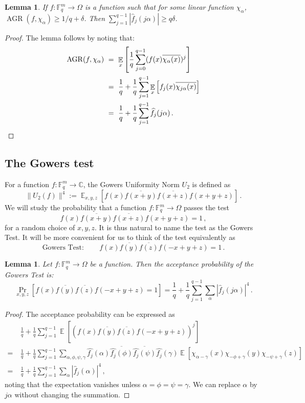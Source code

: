 \documentclass[10pt]{article}
\newtheorem{lemma}[theorem]{Lemma}
\theoremstyle{definition}
\numberwithin{equation}{section}
\newcommand\F{\mathbb{F}}
\DeclareMathOperator*\Exp{\mathbb{E}}
\DeclareMathOperator\AGR{AGR}
\renewcommand{\mapsto}{\to}
\begin{document}
\begin{lemma}\label{lemma:agr} If $f: \F_q^m \mapsto \Omega$ is a function such that for some
linear function $\chi_\alpha$, $\AGR(f, \chi_\alpha) \geq {1}/{q}+\delta$. Then
$\sum_{j=1}^{q-1} \left| \widehat{f}_{j}(j \alpha) \right| \geq q\delta$.
\end{lemma}
\begin{proof} The lemma follows by noting that:
\begin{align*}
\AGR(f, \chi_\alpha)\ &=\  \Exp_x \left[  \frac{1}{q} \sum_{j=0}^{q-1} (f(x) \overline{\chi_\alpha(x)})^j   \right] \\
 &=\   \frac{1}{q} + \frac{1}{q} \sum_{j=1}^{q-1} \Exp_x \left[ f_j(x) \overline{\chi_{j \alpha}(x)}   \right] \\
 &=\  \frac{1}{q} + \frac{1}{q}  \sum_{j=1}^{q-1} \widehat{f}_j (j \alpha)\,.\qedhere
\end{align*}
\end{proof}

\subsection{The Gowers test}\label{sec:gowers-test}

For a function $f: \F_q^m \mapsto {\mathbb C}$, the Gowers Uniformity Norm $U_2$ \cite{Gowers} is defined as
 $$ \| U_2(f) \|^4 := \Exp_{x,y,z} \left[ f(x) \overline{f(x+y)}\overline{f(x+z)} f(x+y+z)   \right]\,. $$
We will study the probability that a function $f: \F_q^m \mapsto \Omega$ passes the test
$$f(x) \overline{f(x+y)}\overline{f(x+z)} f(x+y+z) =1\,,$$
for a random choice of $x,y,z$. It is thus natural to name the test as the Gowers Test.
It will be more convenient for us to think of the test equivalently
as $$\mbox{Gowers Test}: \quad\quad f(x) \overline{f(y)}\overline{f(z)} f(-x+y+z) =1\,.$$

\begin{lemma} Let $f: \F_q^m \mapsto \Omega$ be a function. Then the acceptance probability of the Gowers Test is:
$$ \Pr_{x,y,z} \left[f(x) \overline{f(y)}\overline{f(z)} f(-x+y+z) =1 \right]
   = \frac{1}{q} + \frac{1}{q} \sum_{j=1}^{q-1} \sum_\alpha  \left| \widehat{f}_j (j\alpha)\right|^4\,.   $$
\end{lemma}
\begin{proof} The acceptance probability can be expressed as
\begin{align*}
   &  \frac{1}{q} + \frac{1}{q} \sum_{j=1}^{q-1} \Exp \left[ (f(x) \overline{f(y)}\overline{f(z)} f(-x+y+z))^j   \right] \\
  =\ & \frac{1}{q} + \frac{1}{q}  \sum_{j=1}^{q-1} \sum_{\alpha, \phi, \psi, \gamma}
 \widehat{f_j}(\alpha) \overline{\widehat{f_j}(\phi)} \overline{\widehat{f_j}(\psi)}\widehat{f_j}(\gamma)
  \Exp \left[ \chi_{\alpha - \gamma}(x) \chi_{-\phi + \gamma}(y) \chi_{-\psi + \gamma}(z)    \right] \\
  =\ &  \frac{1}{q} + \frac{1}{q}  \sum_{j=1}^{q-1} \sum_\alpha \left| \widehat{f}_j (\alpha)\right|^4\,,
\end{align*}
noting that the expectation vanishes unless $\alpha = \phi = \psi = \gamma$. We can replace
$\alpha$ by $j \alpha$ without changing the summation.
\end{proof}
\end{document}
